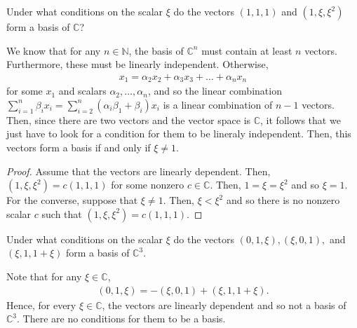 \documentclass[12pt]{article}
\newcommand{\N}{\mathbb{N}}
\newenvironment{problem}[2][Problem]{\begin{trivlist} \item[\hskip \labelsep {\bfseries #1}\hskip \labelsep {\bfseries #2.}]}{\end{trivlist}}
\newenvironment{solution}[1][Solution]{\begin{trivlist} \item[\hskip \labelsep {\bfseries #1}]}{\end{trivlist}}
\begin{document}
\begin{problem}{8}
\begin{enumerate}
  \item Under what conditions on the scalar $\xi$ do the vectors $(1,1,1)$ and $(1,\xi,\xi^{2})$ form a basis of $\mathbb{C}$?
\begin{solution}
  We know that for any $n\in\N$, the basis of $\mathbb{C}^{n}$ must contain at least $n$ vectors. Furthermore, these must be linearly independent. Otherwise,
\begin{align*}
  x_{1} = \alpha_{2}x_{2}+\alpha_{3}x_{3}+\dots+\alpha_{n}x_{n}
\end{align*}
for some $x_{1}$ and scalars $\alpha_{2},\dots,\alpha_{n}$, and so the linear combination $\sum_{i=1}^{n}\beta_{i}x_{i} = \sum_{i=2}^{n}(\alpha_{i}\beta_{1} + \beta_{i})x_{i}$ is a linear combination of $n-1$ vectors.\\

Then, since there are two vectors and the vector space is $\mathbb{C}$, it follows that we just have to look for a condition for them to be lineraly independent. Then, this vectors form a basis if and  only if $\xi \neq 1$. 
\begin{proof}
  Assume that the vectors are linearly dependent. Then, $(1,\xi,\xi^{2}) = c(1,1,1)$ for some nonzero $c\in \mathbb{C}$. Then, $1=\xi = \xi^{2}$ and so $\xi = 1$. \\

  For the converse, suppose that $\xi \neq 1$. Then, $\xi < \xi^{2}$ and so there is no nonzero scalar $c$ such that $(1,\xi,\xi^{2}) = c(1,1,1)$. 
\end{proof}
\end{solution}
  \item Under what conditions on the scalar $\xi$ do the vectors $(0,1,\xi), (\xi,0,1),$ and $(\xi,1,1+\xi)$ form a basis of $\mathbb{C}^{3}$.
\begin{solution}
  Note that for any $\xi \in \mathbb{C}$, 
\begin{align*}
  (0,1,\xi) = - (\xi,0,1) + (\xi,1,1+\xi).
\end{align*}
Hence, for every $\xi\in \mathbb{C}$, the vectors are linearly dependent and so not a basis of $\mathbb{C}^{3}$. There are no conditions for them to be a basis.
\end{solution}
\end{enumerate}
\end{problem}
\end{document}
